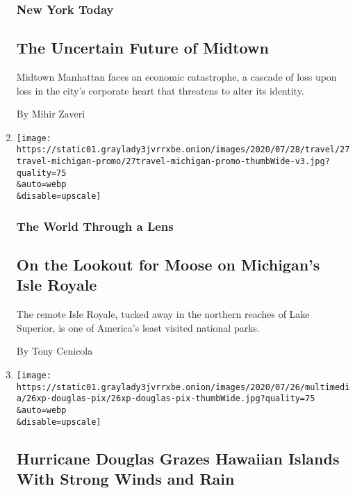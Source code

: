 \begin{enumerate}
  \hypertarget{new-york-today}{%
  \subsubsection{New York Today}\label{new-york-today}}

  \hypertarget{the-uncertain-future-of-midtown}{%
  \subsection{The Uncertain Future of
  Midtown}\label{the-uncertain-future-of-midtown}}

  Midtown Manhattan faces an economic catastrophe, a cascade of loss
  upon loss in the city's corporate heart that threatens to alter its
  identity.~

  By Mihir Zaveri
\item
  \href{/2020/07/27/travel/moose-michigan-isle-royale.html}{}

  \texttt{[image: https://static01.graylady3jvrrxbe.onion/images/2020/07/28/travel/27travel-michigan-promo/27travel-michigan-promo-thumbWide-v3.jpg?quality=75\\\&auto=webp\\\&disable=upscale]}

  \hypertarget{the-world-through-a-lens}{%
  \subsubsection{The World Through a
  Lens}\label{the-world-through-a-lens}}

  \hypertarget{on-the-lookout-for-moose-on-michigans-isle-royale}{%
  \subsection{On the Lookout for Moose on Michigan's Isle
  Royale}\label{on-the-lookout-for-moose-on-michigans-isle-royale}}

  The remote Isle Royale, tucked away in the northern reaches of Lake
  Superior, is one of America's least visited national parks.

  By Tony Cenicola
\item
  \href{/2020/07/26/us/hurricane-douglas-hawaii.html}{}

  \texttt{[image: https://static01.graylady3jvrrxbe.onion/images/2020/07/26/multimedia/26xp-douglas-pix/26xp-douglas-pix-thumbWide.jpg?quality=75\\\&auto=webp\\\&disable=upscale]}

  \hypertarget{hurricane-douglas-grazes-hawaiian-islands-with-strong-winds-and-rain}{%
  \subsection{Hurricane Douglas Grazes Hawaiian Islands With Strong
  Winds and
  Rain}\label{hurricane-douglas-grazes-hawaiian-islands-with-strong-winds-and-rain}}


\end{enumerate}
